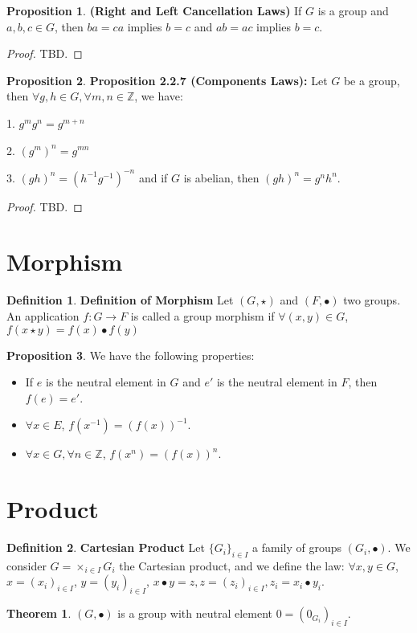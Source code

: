 \documentclass{article}
\theoremstyle{definition}
\newtheorem{defi}{Definition}[subsection]
\newtheorem{theorem}{Theorem}[subsection]
\newtheorem{prop}{Proposition}[subsection]
\begin{document}
\begin{prop}
\noindent\textbf{(Right and Left Cancellation Laws)} If $G$ is a group and $a,b,c \in G$, then $ba=ca$ implies $b=c$ and $ab=ac$ implies $b=c$.
\begin{proof}
TBD.
\end{proof}
\end{prop}

\begin{prop}
\noindent\textbf{Proposition 2.2.7 (Components Laws):} Let $G$ be a group, then $\forall g,h \in G, \forall m,n \in \mathbb{Z}$, we have:

1. $g^{m}g^{n}=g^{m+n}$

2. $(g^{m})^{n} = g^{mn}$

3. $ (gh)^{n} = (h^{-1}g^{-1})^{-n} $ and if $G$ is abelian, then $(gh)^{n} = g^nh^n$.
\begin{proof}
TBD.
\end{proof}
\end{prop}

\section{Morphism}

\begin{defi}
\noindent\textbf{Definition of Morphism} Let $(G, \star)$ and $(F, \bullet)$ two groups. An application $f: G \to F$ is called a group morphism if $\forall (x, y) \in G$, $f(x \star y) = f(x) \bullet f(y)$
\end{defi}

\begin{prop}
We have the following properties:
\begin{itemize}
    \item If $e$ is the neutral element in $G$ and $e'$ is the neutral element in $F$, then $f(e)=e'$.
    \item $\forall x\in E$, $f(x^{-1})=(f(x))^{-1}$.
    \item $\forall x\in G, \forall n\in\mathbb{Z}$, $f(x^{n})=(f(x))^{n}$.
\end{itemize}
\end{prop}

\section{Product}
\begin{defi}
\textbf{Cartesian Product} Let $\{G_i\}_{i\in I}$ a family of groups $(G_i,\bullet)$. We consider $G=\times_{i\in I}G_i$ the Cartesian product, and we define the law: $\forall x,y \in G$, $x=(x_i)_{i\in I}$, $y=(y_i)_{i\in I}$, $x\bullet y=z,z = (z_i)_{i\in I}, z_i=x_i\bullet y_i$.

\begin{theorem}
$(G,\bullet)$ is a group with neutral element $0=(0_{G_i})_{i\in I}$.
\end{theorem}
\end{defi}
\end{document}
